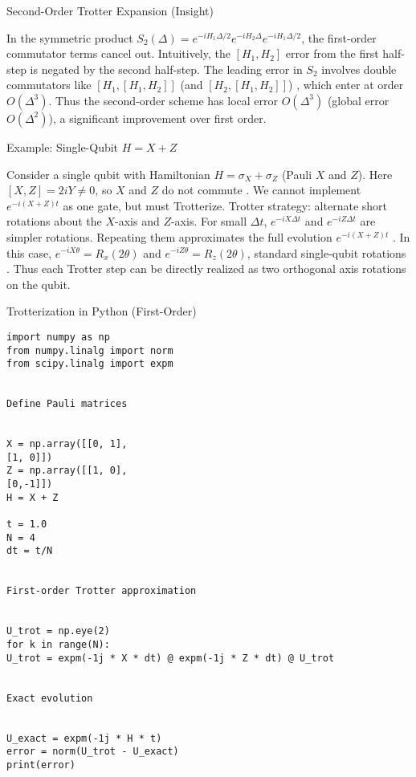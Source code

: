 \documentclass{beamer}
\begin{document}
\begin{frame}{Second-Order Trotter Expansion (Insight)}

In the symmetric product $S_2(\Delta)=e^{-iH_1\Delta/2}e^{-iH_2\Delta}e^{-iH_1\Delta/2}$, the first-order commutator terms cancel out. Intuitively, the $[H_1,H_2]$ error from the first half-step is negated by the second half-step.
The leading error in $S_2$ involves double commutators like $[H_1,[H_1,H_2]]$ (and $[H_2,[H_1,H_2]]$) , which enter at order $O(\Delta^3)$. Thus the second-order scheme has local error $O(\Delta^3)$ (global error $O(\Delta^2)$), a significant improvement over first order. \end{frame}


\begin{frame}{Example: Single-Qubit $H = X + Z$}

Consider a single qubit with Hamiltonian $H = \sigma_X + \sigma_Z$ (Pauli $X$ and $Z$). Here $[X,Z] = 2iY \neq 0$, so $X$ and $Z$ do not commute . We cannot implement $e^{-i(X+Z)t}$ as one gate, but must Trotterize.
Trotter strategy: alternate short rotations about the $X$-axis and $Z$-axis. For small $\Delta t$, $e^{-iX \Delta t}$ and $e^{-iZ \Delta t}$ are simpler rotations. Repeating them approximates the full evolution $e^{-i(X+Z)t}$ .
In this case, $e^{-iX \theta} = R_x(2\theta)$ and $e^{-iZ \theta} = R_z(2\theta)$, standard single-qubit rotations . Thus each Trotter step can be directly realized as two orthogonal axis rotations on the qubit. \end{frame}


\begin{frame}[fragile]{Trotterization in Python (First-Order)}
\lstset{basicstyle=\ttfamily\footnotesize, language=Python}
\begin{lstlisting}
import numpy as np
from numpy.linalg import norm
from scipy.linalg import expm


Define Pauli matrices


X = np.array([[0, 1],
[1, 0]])
Z = np.array([[1, 0],
[0,-1]])
H = X + Z

t = 1.0
N = 4
dt = t/N


First-order Trotter approximation


U_trot = np.eye(2)
for k in range(N):
U_trot = expm(-1j * X * dt) @ expm(-1j * Z * dt) @ U_trot


Exact evolution


U_exact = expm(-1j * H * t)
error = norm(U_trot - U_exact)
print(error)
\end{lstlisting}
\end{frame}
\end{document}
